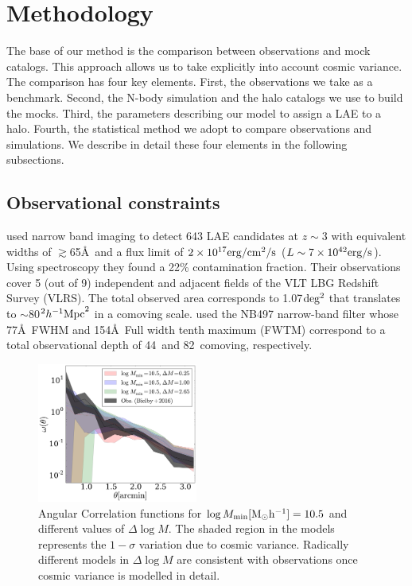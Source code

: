 \documentclass{emulateapj}
\newcommand{\hMpc}{{\ifmmode{h^{-1}{\rm Mpc}}\else{$h^{-1}$Mpc}\fi}}
\begin{document}
\section{Methodology}

The base of our method is the comparison between observations and mock
catalogs. 
This approach allows us to take explicitly into account cosmic variance. 
The comparison has four key elements. 
First, the observations we take as a benchmark. 
Second, the N-body simulation and the halo catalogs we use to build
the mocks. 
Third, the parameters describing our model to
assign a LAE to a halo. 
Fourth, the statistical method we adopt to compare observations and
simulations.  
We describe in detail these four elements in the following subsections.




\subsection{Observational constraints}
\label{subsec:obs}
\citet{Bielby16} used narrow band imaging to detect 643 LAE candidates
at $z\sim 3$  with equivalent widths of $\gtrsim$65\AA\ and a flux limit
of $2\times10^{17}{\rm erg/cm^2/s}$ ($L\sim 7\times10^{42}{\rm erg/s} $). 
Using spectroscopy they found a 22\% contamination fraction.
Their observations cover 5 (out of 9) independent and adjacent
fields of the VLT LBG Redshift Survey (VLRS).  
The  total observed  area corresponds to 1.07$\rm deg^2$ that translates to
$\sim$80$^2\hMpc^2$ in a comoving scale. 
\citet{Bielby16} used the NB497  narrow-band filter whose 77\AA\ FWHM
and 154\AA\ Full width  tenth maximum (FWTM) correspond to a total observational depth of
44\hMpc\  and 82\hMpc\ comoving, respectively. 

\begin{figure}
  \includegraphics[width=0.47\textwidth]{fig5.pdf}
\caption{ Angular Correlation functions for $\log M_{\rm
    min}[\rm{M_{\odot}h^{-1}}]=10.5$ and different values of $\Delta \log
  M$.  
  The shaded region in the models represents the $1-\sigma$ variation
  due to cosmic variance. Radically different models in $\Delta \log M$ are consistent with
  observations once cosmic variance is modelled in detail.} 
\label{fig:corr}
\end{figure}
\end{document}
